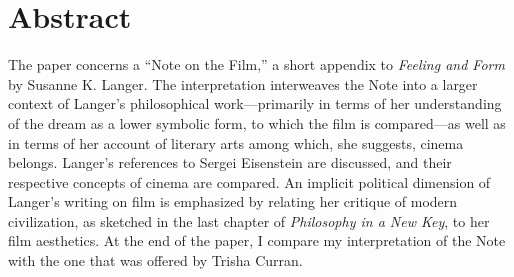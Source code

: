 \documentclass{tufte-handout}
\begin{document}
\begin{titlepage}
\begin{fullwidth}
\end{fullwidth}

\vspace*{2em}


\small{}

\vspace*{2em}

\hypertarget{abstract}{%
\section{Abstract}\label{abstract}}

The paper concerns a ``Note on the Film,'' a short appendix to
\emph{Feeling and Form} by Susanne K. Langer. The interpretation
interweaves the Note into a larger context of Langer's philosophical
work---primarily in terms of her understanding of the dream as a lower
symbolic form, to which the film is compared---as well as in terms of
her account of literary arts among which, she suggests, cinema belongs.
Langer's references to Sergei Eisenstein are discussed, and their
respective concepts of cinema are compared. An implicit political
dimension of Langer's writing on film is emphasized by relating her
critique of modern civilization, as sketched in the last chapter of
\emph{Philosophy in a New Key}, to her film aesthetics. At the end of
the paper, I compare my interpretation of the Note with the one that was
offered by Trisha Curran.





\enlargethispage{2\baselineskip}

\vspace*{10em}



 \end{titlepage}

\end{document}
